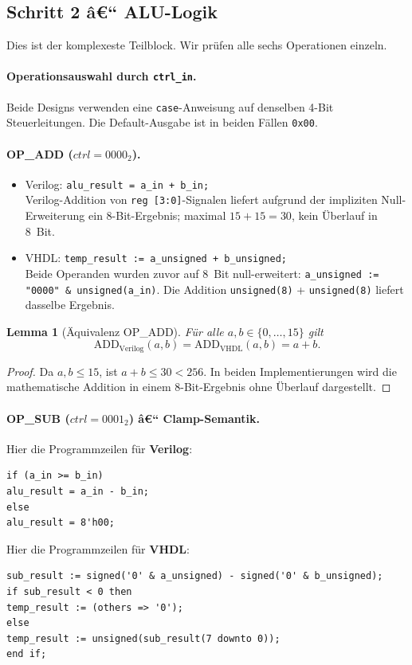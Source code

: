﻿\documentclass[12pt,a4paper]{report}
\newtheorem{lemma}[theorem]{Lemma}
\begin{document}
\subsection{Schritt 2 â€“ ALU-Logik}
\label{sssec:alu_logik}

Dies ist der komplexeste Teilblock.  Wir prüfen alle sechs Operationen einzeln.

\paragraph{Operationsauswahl durch \texttt{ctrl\_in}.}
Beide Designs verwenden eine \texttt{case}-Anweisung auf denselben 4-Bit
Steuerleitungen.  Die Default-Ausgabe ist in beiden Fällen \texttt{0x00}.

\paragraph{OP\_ADD ($ctrl = 0000_2$).}
\begin{itemize}
	\item Verilog: \quad\texttt{alu\_result = a\_in + b\_in;}\\
	Verilog-Addition von \texttt{reg [3:0]}-Signalen liefert aufgrund der
	impliziten Null-Erwei\-terung ein 8-Bit-Ergebnis; maximal $15+15=30$, kein
	Überlauf in 8~Bit.
	\item VHDL: \quad\texttt{temp\_result := a\_unsigned + b\_unsigned;}\\
	Beide Operanden wurden zuvor auf 8~Bit null-erweitert:
	\texttt{a\_unsigned := "0000" \& unsigned(a\_in)}.  Die Addition
	\texttt{unsigned(8)} + \texttt{unsigned(8)} liefert dasselbe Ergebnis.
\end{itemize}

\begin{lemma}[Äquivalenz OP\_ADD]
	Für alle $a,b \in \{0,\ldots,15\}$ gilt
	\[
	\mathrm{ADD}_\mathrm{Verilog}(a,b) = \mathrm{ADD}_\mathrm{VHDL}(a,b) = a + b.
	\]
\end{lemma}
\begin{proof}
	Da $a, b \leq 15$, ist $a + b \leq 30 < 256$.  In beiden Implementierungen
	wird die mathematische Addition in einem 8-Bit-Ergebnis ohne Überlauf
	dargestellt.
\end{proof}

\paragraph{OP\_SUB ($ctrl = 0001_2$) â€“ Clamp-Semantik.}
Hier die Programmzeilen für \textbf{Verilog}:
\begin{lstlisting}[style=hdlstyle]
if (a_in >= b_in)
alu_result = a_in - b_in;
else
alu_result = 8'h00;
\end{lstlisting}
Hier die Programmzeilen für \textbf{VHDL}:
\begin{lstlisting}[style=hdlstyle]
sub_result := signed('0' & a_unsigned) - signed('0' & b_unsigned);
if sub_result < 0 then
temp_result := (others => '0');
else
temp_result := unsigned(sub_result(7 downto 0));
end if;
\end{lstlisting}
\end{document}
